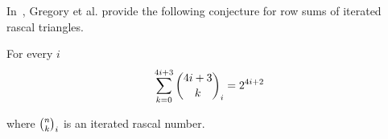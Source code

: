 ﻿In~\cite{gregory2023iterated}, Gregory et al.
provide the following conjecture for row sums of iterated rascal triangles.
\begin{conjecture}
    \label{conjecture:row_sums}
    For every $i$
    \begin{align*}
        \sum_{k=0}^{4i+3} \binom{4i+3}{k}_{i} = 2^{4i+2}
    \end{align*}
\end{conjecture}
where $\binom{n}{k}_{i}$ is an iterated rascal number.
